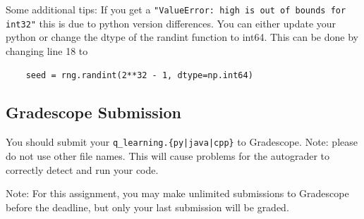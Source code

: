 \documentclass[11pt,addpoints,answers]{exam}
\begin{document}
Some additional tips: If you get a \texttt{"ValueError: high is out of bounds for int32"} this is due to python version differences. You can either update your python or change the dtype of the randint function to int64. This can be done by changing line 18 to
\begin{verbatim}
    seed = rng.randint(2**32 - 1, dtype=np.int64)
\end{verbatim}


\subsection{Gradescope Submission}

You should submit your \texttt{q\_learning.\{py|java|cpp\}} to Gradescope.
Note: please do not use other file names. This will cause problems for the autograder to correctly detect and run your code.

Note: For this assignment, you may make unlimited submissions to Gradescope before the deadline, but only your last submission will be graded.
\end{document}
